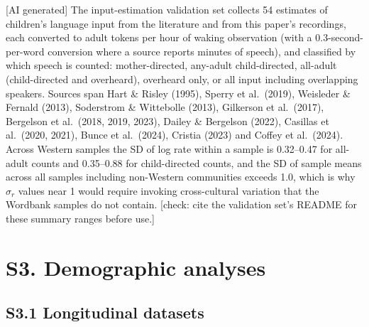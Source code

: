 \begin{table}[htbp]
\centering\footnotesize
\caption{[AI generated] The evidence behind the $\sigma_r$ anchors: all-adult
tokens per waking hour in Western samples. Literature rows are the entries of the
input-estimation validation set (\texttt{studies/input\_estimation/}) for which a
within-sample SD of log rate could be computed from per-child data; ``pooled''
rows combine the sites above them. The paper's own rows give the raw SD of
children's mean log rate per dataset and, last, the measurement model's
noise-corrected estimate. Regenerated by \texttt{paper/tables/sigma\_r\_tables.R}.}
\label{tab:si-sigma-r-evidence}

\end{table}

[AI generated] The input-estimation validation set collects 54 estimates of
children's language input from the literature and from this paper's recordings,
each converted to adult tokens per hour of waking observation (with a
0.3-second-per-word conversion where a source reports minutes of speech), and
classified by which speech is counted: mother-directed, any-adult child-directed,
all-adult (child-directed and overheard), overheard only, or all input including
overlapping speakers. Sources span Hart \& Risley (1995), Sperry et al.\ (2019),
Weisleder \& Fernald (2013), Soderstrom \& Wittebolle (2013), Gilkerson et al.\
(2017), Bergelson et al.\ (2018, 2019, 2023), Dailey \& Bergelson (2022), Casillas
et al.\ (2020, 2021), Bunce et al.\ (2024), Cristia (2023) and Coffey et al.\
(2024). Across Western samples the SD of log rate within a sample is 0.32--0.47
for all-adult counts and 0.35--0.88 for child-directed counts, and the SD of
sample means across all samples including non-Western communities exceeds 1.0,
which is why $\sigma_r$ values near 1 would require invoking cross-cultural
variation that the Wordbank samples do not contain. [check: cite the validation
set's README for these summary ranges before use.]

\section*{S3. Demographic analyses}

\subsection*{S3.1 Longitudinal datasets}

